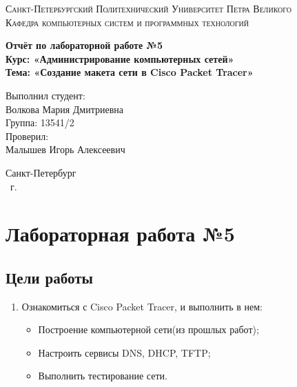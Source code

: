 \documentclass[14pt,a4paper,report]{report}
\begin{document}
\def\contentsname{Содержание}

\begin{titlepage}
	\begin{center}
		\textsc{Санкт-Петербургский Политехнический 
			Университет Петра Великого\\[5mm]
			Кафедра компьютерных систем и программных технологий}
		
		\vfill
		
		\textbf{Отчёт по лабораторной работе №5\\[3mm]
			Курс: «Администрирование компьютерных сетей»\\[3mm]
			Тема: «Создание макета сети в Cisco Packet Tracer»\\[35mm]
			}
	\end{center}
	
	\hfill
	\begin{minipage}{.5\textwidth}
		Выполнил студент:\\[2mm] 
		Волкова Мария Дмитриевна\\
		Группа: 13541/2\\[5mm]
		
		Проверил:\\[2mm] 
		Малышев Игорь Алексеевич
	\end{minipage}
	\vfill
	\begin{center}
		Санкт-Петербург\\ \the\year\ г.
	\end{center}
\end{titlepage}

\tableofcontents
\clearpage

\chapter{Лабораторная работа №5}
\section{Цели работы}
\begin{enumerate}
\item Ознакомиться с Cisco Packet Tracer, и выполнить в нем:
\begin{itemize}
\item Построение компьютерной сети(из прошлых работ);
\item Настроить сервисы DNS, DHCP, TFTP;
\item Выполнить тестирование сети.
\end{itemize}
\end{enumerate}
\end{document}
